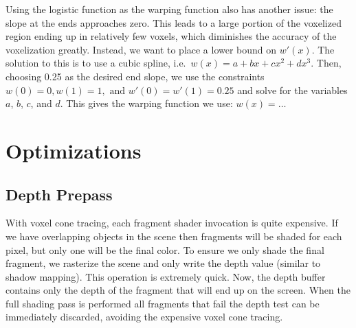 Using the logistic function as the warping function also has another issue: the slope at the ends approaches zero. This leads to a large portion of the voxelized region ending up in relatively few voxels, which diminishes the accuracy of the voxelization greatly. %
Instead, we want to place a lower bound on $w'(x)$. The solution to this is to use a cubic spline, i.e.\ $w(x) = a + bx + cx^2 + dx^3$. Then, choosing 0.25 as the desired end slope, we use the  constraints $w(0) = 0, w(1) = 1, \text{ and } w'(0) = w'(1) = 0.25$ and solve for the variables $a$, $b$, $c$, and $d$. This gives the warping function we use: $w(x) = \ldots$ %

 
\section{Optimizations}
\subsection{Depth Prepass}
With voxel cone tracing, each fragment shader invocation is quite expensive. If we have overlapping objects in the scene then fragments will be shaded for each pixel, but only one will be the final color. To ensure we only shade the final fragment, we rasterize the scene and only write the depth value (similar to shadow mapping). This operation is extremely quick. Now, the depth buffer contains only the depth of the fragment that will end up on the screen. When the full shading pass is performed all fragments that fail the depth test can be immediately discarded, avoiding the expensive voxel cone tracing.

